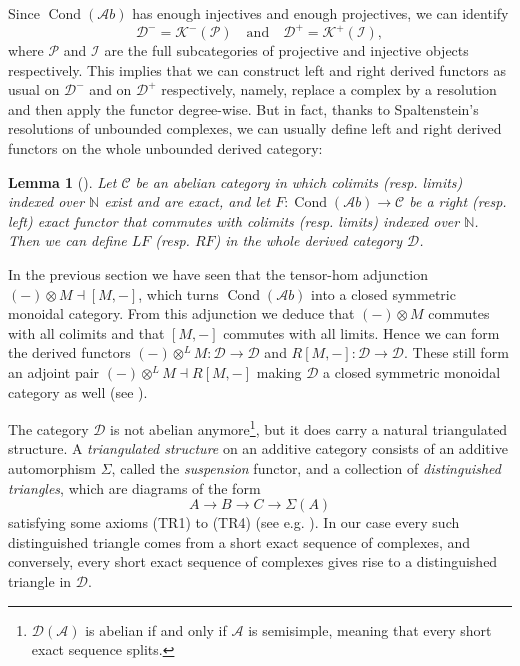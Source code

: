 \documentclass[11pt,A4]{article}
\theoremstyle{plain}
\newtheorem{lm}[thm]{Lemma}
\theoremstyle{definition}
\theoremstyle{remark}
\newcommand{\N}{\mathbb{N}}
\newcommand{\1}{\mathbbm{1}}
\newcommand{\scrC}{\mathscr{C}}
\newcommand{\Ab}{\mathscr{A}b}
\newcommand{\D}{\mathscr{D}}
\newcommand{\K}{\mathscr{K}}
\DeclareMathOperator{\Cond}{Cond}
\newcommand{\ot}{\otimes}
\begin{document}
Since $\Cond(\Ab)$ has enough injectives and enough projectives, we can identify
\[ \D^{-}=\K^{-}(\mathscr{P}) \quad \text{and} \quad \D^{+}=\K^{+}(\mathscr{I}),\]
where $\mathscr{P}$ and $\mathscr{I}$ are the full subcategories of projective and injective objects respectively.
This implies that we can construct left and right derived functors as usual on $\D^{-}$ and on $\D^{+}$ respectively, namely, replace a complex by a resolution and then apply the functor degree-wise.
But in fact, thanks to Spaltenstein's resolutions of unbounded complexes, we can usually define left and right derived functors on the whole unbounded derived category:

\begin{lm}[{\cite[\href{https://stacks.math.columbia.edu/tag/0794}{Tag 0794}]{sta19}}]
    Let $\scrC$ be an abelian category in which colimits (resp. limits) indexed over $\N$ exist and are exact, and let $F\colon \Cond(\Ab)\to \scrC$ be a right (resp. left) exact functor that commutes with colimits (resp. limits) indexed over $\N$.
    Then we can define $LF$ (resp. $RF$) in the whole derived category $\D$.
\end{lm}

In the previous section we have seen that the tensor-hom adjunction $(-)\ot M\dashv [M,-]$, which turns $\Cond(\Ab)$ into a closed symmetric monoidal category.
From this adjunction we deduce that $(-)\ot M$ commutes with all colimits and that $[M,-]$ commutes with all limits.
Hence we can form the derived functors $(-)\ot^{L}M\colon \D\to \D$ and $R[M,-]\colon \D\to \D$.
These still form an adjoint pair $(-)\ot^{L}M\dashv R[M,-]$ making $\D$ a closed symmetric monoidal category as well (see \cite[\href{https://stacks.math.columbia.edu/tag/09T5}{Tag 09T5}]{sta19}).

The category $\D$ is not abelian anymore\footnote{$\D(\mathscr{A})$ is abelian if and only if $\mathscr{A}$ is semisimple, meaning that every short exact sequence splits.}, but it does carry a natural triangulated structure.
A \textit{triangulated structure} on an additive category consists of an additive automorphism $\Sigma$, called the \textit{suspension} functor, and a collection of \textit{distinguished triangles}, which are diagrams of the form
\[ A\to B\to C\to\Sigma(A) \]
satisfying some axioms (TR1) to (TR4) (see e.g. \cite{gm03}).
In our case every such distinguished triangle comes from a short exact sequence of complexes, and conversely, every short exact sequence of complexes gives rise to a distinguished triangle in $\D$.
\end{document}
